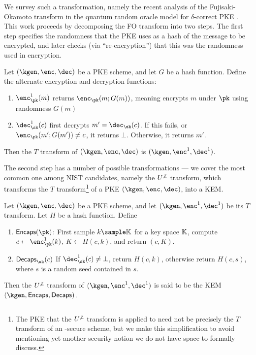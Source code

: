 We survey such a transformation, namely the recent analysis of the Fujisaki-Okamoto transform \cite{C:FujOka99} in the quantum random oracle model for $\delta$-correct PKE \cite{TCC:HofHovKil17}.
This work proceeds by decomposing the FO transform into two steps.
The first step specifies the randomness that the PKE uses as a hash of the message to be encrypted, and later checks (via ``re-encryption'') that this was the randomness used in encryption.
\begin{definition}
	Let $(\kgen, \enc, \dec)$ be a PKE scheme, and let $G$ be a hash function.
	Define the alternate encryption and decryption functions:
	\begin{enumerate}
		\item $\enc^1_{\pk}(m)$ returns $\enc_{\pk}(m ; G(m))$, meaning encrypts $m$ under $\pk$ using randomness $G(m)$
		\item $\dec_{\sk}^1(c)$ first decrypts $m' = \dec_{\sk}(c)$. If this fails, or $\enc_{\pk}(m';G(m'))\neq c$, it returns $\bot$. Otherwise, it returns $m'$.
	\end{enumerate}
	Then the $T$ transform of $(\kgen, \enc, \dec)$ is $(\kgen, \enc^1,\dec^1)$.
\end{definition}

The second step has a number of possible transformations --- we cover the most common one among NIST candidates, namely the $U^{\not\bot}$ transform, which transforms the $T$ transform\footnote{The PKE that the $U^{\not \bot}$ transform is applied to need not be precisely the $T$ transform of an \indcpa-secure scheme, but we make this simplification to avoid mentioning yet another security notion we do not have space to formally discuss.} of a PKE $(\kgen, \enc, \dec)$, into a KEM.
\begin{definition}
	Let $(\kgen, \enc, \dec)$ be a PKE scheme, and let $(\kgen, \enc^1,\dec^1)$ be its $T$ transform.
	Let $H$ be a hash function.
	Define 
	\begin{enumerate}
		\item $\encaps(\pk)$: First sample $k\sample\setfont{K}$ for a key space $\mathbb{K}$, compute $c\gets \enc_{\pk}^1(k)$, $K \gets H(c, k)$, and return $(c, K)$.
		\item $\decaps_{\sk}(c)$ If $\dec_{\sk}^1(c)\neq \bot$, return $H(c, k)$, otherwise return $H(c, s)$, where $s$ is a random seed contained in $s$.
	\end{enumerate}
	Then the $U^{\not\bot}$ transform of $(\kgen, \enc^1, \dec^1)$ is said to be the KEM $(\kgen, \encaps, \decaps)$.
\end{definition}

